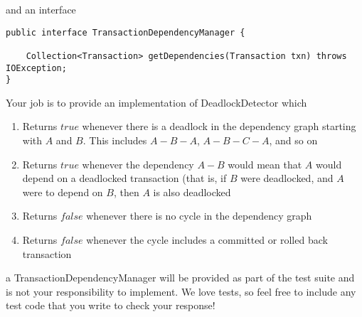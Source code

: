\documentclass[11pt]{article}
\begin{document}
and an interface

\begin{lstlisting}
public interface TransactionDependencyManager {

	Collection<Transaction> getDependencies(Transaction txn) throws IOException;
}
\end{lstlisting}

Your job is to provide an implementation of DeadlockDetector which 

\begin{enumerate}
				\item Returns $true$ whenever there is a deadlock in the dependency graph starting with $A$ and $B$. This includes $A-B-A$, $A-B-C-A$, and so on
				\item Returns $true$ whenever the dependency $A-B$ would mean that $A$ would depend on a deadlocked transaction (that is, if $B$ were deadlocked, and $A$ were to depend on $B$, then $A$ is also deadlocked
				\item Returns $false$ whenever there is no cycle in the dependency graph
				\item Returns $false$ whenever the cycle includes a committed or rolled back transaction
\end{enumerate}

a TransactionDependencyManager will be provided as part of the test suite and is not your responsibility to implement. We love tests, so feel free to include any test code that you write to check your response!
\end{document}
